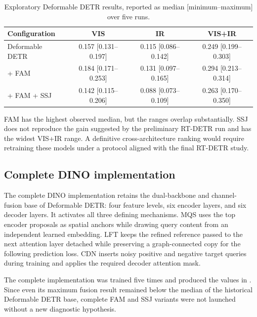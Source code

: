 \begin{table}[H]
  \centering
  \caption{Exploratory Deformable DETR results, reported as median
  [minimum--maximum] \mapfifty{} over five runs.}
  \label{tab:defdetr-exploratory}
  \begin{tabular}{lccc}
    \toprule
    Configuration & VIS & IR & VIS+IR \\
    \midrule
    Deformable DETR & 0.157 [0.131--0.197] & 0.115 [0.086--0.142] & 0.249 [0.199--0.303] \\
    + FAM & 0.184 [0.171--0.253] & 0.131 [0.097--0.165] & 0.294 [0.213--0.314] \\
    + FAM + SSJ & 0.142 [0.115--0.206] & 0.088 [0.073--0.109] & 0.263 [0.170--0.350] \\
    \bottomrule
  \end{tabular}
\end{table}

FAM has the highest observed median, but the ranges overlap substantially.
SSJ does not reproduce the gain suggested by the preliminary RT-DETR run and
has the widest VIS+IR range. A definitive cross-architecture ranking would
require retraining these models under a protocol aligned with the final
RT-DETR study.

\subsection{Complete DINO implementation}
\label{sec:dino-exploration}

The complete DINO implementation retains the dual-backbone and channel-fusion
base of Deformable DETR: four feature levels, six encoder layers, and six
decoder layers. It activates all three defining mechanisms. MQS uses the top
encoder proposals as spatial anchors while drawing query content from an
independent learned embedding. LFT keeps the refined reference passed to the
next attention layer detached while preserving a graph-connected copy for the
following prediction loss. CDN inserts noisy positive and negative target
queries during training and applies the required decoder attention mask.

The complete implementation was trained five times and produced the values in
. Since even its maximum fusion result remained
below the median of the historical Deformable DETR base, complete FAM and SSJ
variants were not launched without a new diagnostic hypothesis.

